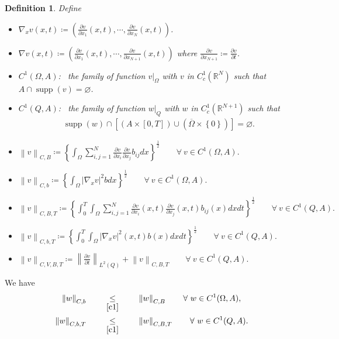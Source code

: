 \documentclass[11pt, a4paper]{article}
\newtheorem{definition}{Definition}%
\numberwithin{equation}{section}
\newcommand{\coex}[2][\hphantom{longexplanation}]{%
  \underset{{#1}}{\overset{\hphantom{longexplanation}}{#2}}
}
\newcommand{\RR}{{\mathbb R}}
\newcommand{\norm}[1]{\left\lVert #1\right\rVert}
\DeclareMathOperator{\supp}{supp}
\begin{document}
\begin{definition}
  Define
  \begin{itemize}
  \item $\displaystyle \nabla_{x}v(x,t)\coloneqq\left(\frac{\partial v}{\partial
    x_{1}}(x,t),\cdots,\frac{\partial v}{\partial x_{N}}(x,t)
\right)$.
\item $\displaystyle\nabla v(x,t)\coloneqq\left(\frac{\partial v}{\partial
    x_{1}}(x,t),\cdots,\frac{\partial v}{\partial x_{N+1}}(x,t) \right)$
  where
  $\displaystyle \frac{\partial v}{\partial x_{N+1}}\coloneqq\frac{\partial
    v}{\partial t}$.
\item $C^{1}(\Omega,A)$:~ the family of function
  $v|_{\Omega}$ with $v$ in $C_{c}^{1}(\RR^{N})$ such that
  $ A\cap \supp (v) = \varnothing$.
\item $C^{1}(Q,A)$:~ the family of
  function $w\vert_{Q}$ with $w$ in $C_{c}^{1}(\RR^{N+1})$ such that
  \begin{align*}
  \supp(w)\cap [(A\times [0,T])\cup (\overline{\Omega}\times \left\{0\right\})]
  =\varnothing.
  \end{align*}
\item  $\displaystyle\norm{v}_{C,B} \coloneqq
  \left\{\int_{\Omega}\sum_{i,j=1}^{N}\frac{\partial v}{\partial
    x_{i}}\frac{\partial v}{\partial x_{j}}b_{ij}dx\right\}^{\frac{1}{2}}
  \qquad\forall~v \in C^{1}(\Omega,A).$
\item  $\displaystyle\norm{v}_{C,b} \coloneqq \left\{\int_{\Omega}|\nabla _{x}
  v|^{2}bdx\right\}^{\frac{1}{2}} \qquad\forall~v \in
C^{1}(\Omega,A).$
\item  $\displaystyle\norm{v}_{C,B,T} \coloneqq
  \left\{\int_{0}^{T}\int_{\Omega}\sum_{i,j=1}^{N}\frac{\partial
    v}{\partial x_{i}}(x,t)\frac{\partial v}{\partial
    x_{j}}(x,t)b_{ij}(x)dxdt\right\}^{\frac{1}{2}} \qquad\forall~v \in
  C^{1}(Q,A).$
\item  $\displaystyle\norm{v}_{C,b,T} \coloneqq
  \left\{\int_{0}^{T}\int_{\Omega}|\nabla_{x}v|^{2}(x,t)
  b(x)dxdt\right\}^{\frac{1}{2}} \qquad\forall~v \in C^{1}(Q,A).$
\item  $\displaystyle\norm{v}_{C,V,B,T} \coloneqq \norm{\frac{\partial v}{\partial  t}}_{L^{2}(Q)} +\norm{v}_{C,B,T} \qquad\forall~v \in C^{1}(Q,A).$
  \end{itemize}
    \label{space}
 \end{definition}
  We have
  \begin{align}
    \norm{w}_{C,b}
    &\coex[\eqref{c1}]{\le} \norm{w}_{C,B}\qquad\forall~w \in C^{1}(\Omega,A),
  \label{i1}\\
  \norm{w}_{C,b,T}
  &\coex[\eqref{c1}]{\le} \norm{w}_{C,B,T}\qquad\forall~w \in C^{1}(Q,A).
  \label{i1b}
\end{align} 
\end{document}
